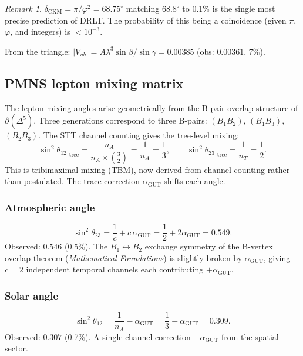 \documentclass[12pt]{article}
\theoremstyle{remark}
\newtheorem{remark}[theorem]{Remark}
\theoremstyle{definition}
\newcommand{\agut}{\alpha_{\mathrm{GUT}}}
\begin{document}
\begin{remark}
$\delta_\text{CKM} = \pi/\varphi^2 = 68.75^\circ$ matching $68.8^\circ$ to 0.1\% is the single most precise prediction of DRLT. The probability of this being a coincidence (given $\pi$, $\varphi$, and integers) is $< 10^{-3}$.
\end{remark}

From the triangle: $|V_{ub}| = A\lambda^3\sin\beta/\sin\gamma = 0.00385$ (obs: $0.00361$, 7\%).

\subsection{PMNS lepton mixing matrix}

The lepton mixing angles arise geometrically from the B-pair overlap structure of $\partial(\Delta^5)$.  Three generations correspond to three B-pairs: $(B_1 B_2)$, $(B_1 B_3)$, $(B_2 B_3)$.  The STT channel counting gives the tree-level mixing:
\begin{equation}
\sin^2\theta_{12}\big|_\text{tree} = \frac{n_A}{n_A \times \binom{3}{2}} = \frac{1}{n_A} = \frac{1}{3}, \qquad
\sin^2\theta_{23}\big|_\text{tree} = \frac{1}{n_T} = \frac{1}{2}.
\end{equation}
This is tribimaximal mixing (TBM), now derived from channel counting rather than postulated.  The trace correction $\agut$ shifts each angle.

\subsubsection{Atmospheric angle}
\begin{equation}
\sin^2\theta_{23} = \frac{1}{c} + c\,\agut = \frac{1}{2} + 2\agut = 0.549.
\end{equation}
Observed: $0.546$ (0.5\%). The $B_1 \leftrightarrow B_2$ exchange symmetry of the B-vertex overlap theorem (\textit{Mathematical Foundations}) is slightly broken by $\agut$, giving $c = 2$ independent temporal channels each contributing $+\agut$.

\subsubsection{Solar angle}
\begin{equation}
\sin^2\theta_{12} = \frac{1}{n_A} - \agut = \frac{1}{3} - \agut = 0.309.
\end{equation}
Observed: $0.307$ (0.7\%). A single-channel correction $-\agut$ from the spatial sector.
\end{document}
